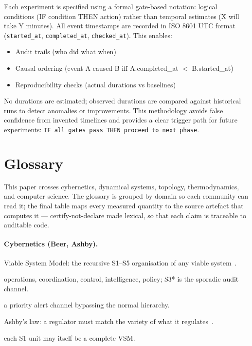 \documentclass[11pt, a4paper]{article}
\begin{document}
Each experiment is specified using a formal gate-based notation:
logical conditions (IF condition THEN action) rather than temporal
estimates (X will take Y minutes).
All event timestamps are recorded in ISO 8601 UTC format
(\texttt{started\_at}, \texttt{completed\_at}, \texttt{checked\_at}).
This enables:
\begin{itemize}
  \item Audit trails (who did what when)
  \item Causal ordering (event A caused B iff A.completed\_at $<$ B.started\_at)
  \item Reproducibility checks (actual durations vs baselines)
\end{itemize}
No durations are estimated; observed durations are compared against
historical runs to detect anomalies or improvements.
This methodology avoids false confidence from invented timelines and
provides a clear trigger path for future experiments:
\texttt{IF all gates pass THEN proceed to next phase}.


\section{Glossary}
\label{sec:glossary}

This paper crosses cybernetics, dynamical systems, topology, thermodynamics, and
computer science. The glossary is grouped by domain so each community can read
it; the final table maps every measured quantity to the source artefact that
computes it --- certify-not-declare made lexical, so that each claim is traceable
to auditable code.

\paragraph{Cybernetics (Beer, Ashby).}
\begin{description}\itemsep2pt
  \item[VSM] Viable System Model: the recursive S1--S5 organisation of any
    viable system~\cite{beer1972brain}.
  \item[S1--S5] operations, coordination, control, intelligence, policy; S3*
    is the sporadic audit channel.
  \item[Algedonic] a priority alert channel bypassing the normal hierarchy.
  \item[Requisite variety] Ashby's law: a regulator must match the variety of
    what it regulates~\cite{ashby1956introduction}.
  \item[Recursion] each S1 unit may itself be a complete VSM.
\end{description}
\end{document}

